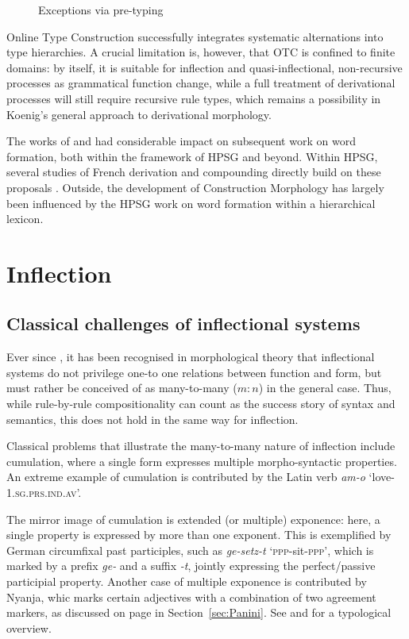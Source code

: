 \documentclass[output=paper
                ,modfonts
                ,nonflat
	        ,collection
	        ,collectionchapter
	        ,collectiontoclongg
 	        ,biblatex
                ,babelshorthands
                ,newtxmath
                ,draftmode
                ,colorlinks, citecolor=brown
] {langscibook}
\begin{document}
{\begin{figure}[htb]
  \caption{Exceptions via pre-typing}
  \label{fig:KoenigPre}
\end{figure}




Online Type Construction successfully integrates systematic
alternations into type hierarchies. A crucial limitation is, however,
that OTC is confined to finite domains: by itself, it is suitable for
inflection and quasi-inflectional, non-recursive processes as
grammatical function change, while a full treatment of derivational
processes will still require recursive rule types, which remains a
possibility in Koenig's general approach to derivational morphology. 

\bigskip\noindent
The works of \citet{Riehemann98} and \cite{Koenig99} had considerable
impact on subsequent work on word formation, both within the framework 
of HPSG and beyond. Within HPSG, several studies of French derivation
and compounding directly build on these proposals \citep[e.g.][]{Tribout10,Desmets09}. 
Outside, the development of Construction Morphology
\citep{Booij10} has largely been influenced by the HPSG work on word
formation within a hierarchical lexicon. 

\section{Inflection}
\label{sec:Infl}

\subsection{Classical challenges of inflectional systems}
\label{sec:InflChallenges}

Ever since \citet{Matthews72}, it has been recognised in morphological
theory that inflectional systems do not privilege one-to one relations
between function and form, but must rather be conceived of as
many-to-many ($m:n$) in the general case. Thus, while
rule-by-rule compositionality can count as the success story
of syntax and semantics, this does not hold in the same way for inflection. 

Classical problems that illustrate the many-to-many nature of
inflection include cumulation, where a single form expresses multiple
morpho-syntactic properties. An extreme example of cumulation is
contributed by the Latin verb \textit{am-o}
`love-1.\textsc{sg}.\textsc{prs}.\textsc{ind}.\textsc{av}'. 

The mirror image of cumulation is extended (or multiple) exponence:
here, a single property is expressed by more than one exponent. This
is exemplified by German circumfixal past participles, such as
\textit{ge-setz-t} `\textsc{ppp}-sit-\textsc{ppp}', which is
 marked by a prefix \textit{ge-} and a suffix \textit{-t},
jointly expressing the perfect/passive participial property. Another
case of multiple exponence is contributed by Nyanja, whic marks
certain adjectives with a combination of two agreement markers, as
discussed on page \pageref{Nyanja} in
Section~\ref{sec:Panini}.  See
\citet{caballero_g-harris_a12} and \citet{Harris17} for a typological overview. 

}
\end{document}
